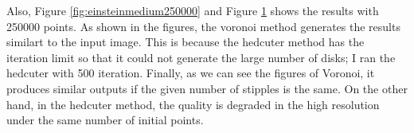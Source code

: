 \documentclass[11pt]{article}
\begin{document}
Also, Figure \ref{fig:einsteinmedium250000} and Figure \ref{fig:einstein250000} shows the results with 250000 points. As shown in the figures, the voronoi method generates the results similart to the input image. This is because the hedcuter method has the iteration limit so that it could not generate the large number of disks; I ran the hedcuter with 500 iteration. Finally, as we can see the figures of Voronoi, it produces similar outputs if the given number of stipples is the same. On the other hand, in the hedcuter method, the quality is degraded in the high resolution under the same number of initial points.
	\begin{figure}[ht] 
	\begin{center}
\parbox[][][c]{0.48\textwidth }{
	\label{fig:einsteinmedium250000}
}
\parbox[][][c]{0.48\textwidth }{
	\label{fig:einstein250000}
}
	\end{center} 
	\end{figure}
\end{document}
